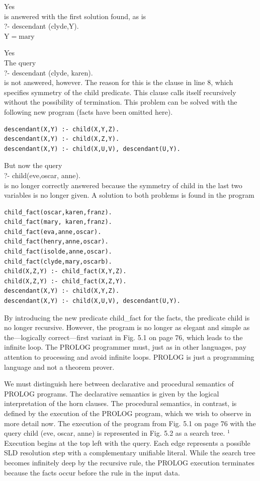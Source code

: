 \documentclass[10pt]{book}
\begin{document}
Yes\\
is answered with the first solution found, as is\\
?- descendant (clyde,Y).\\
$\mathrm{Y}=\mathrm{mar} \mathrm{y}$

Yes\\
The query\\
?- descendant (clyde, karen).\\
is not answered, however. The reason for this is the clause in line 8, which specifies symmetry of the child predicate. This clause calls itself recursively without the possibility of termination. This problem can be solved with the following new program (facts have been omitted here).
\begin{verbatim}
descendant(X,Y) :- child(X,Y,Z).
descendant(X,Y) :- child(X,Z,Y).
descendant(X,Y) :- child(X,U,V), descendant(U,Y).
\end{verbatim}

But now the query\\
?- child(eve,oscar, anne).\\
is no longer correctly answered because the symmetry of child in the last two variables is no longer given. A solution to both problems is found in the program
\begin{verbatim}
child_fact(oscar,karen,franz).
child_fact(mary, karen,franz).
child_fact(eva,anne,oscar).
child_fact(henry,anne,oscar).
child_fact(isolde,anne,oscar).
child_fact(clyde,mary,oscarb).
child(X,Z,Y) :- child_fact(X,Y,Z).
child(X,Z,Y) :- child_fact(X,Z,Y).
descendant(X,Y) :- child(X,Y,Z).
descendant(X,Y) :- child(X,U,V), descendant(U,Y).
\end{verbatim}

By introducing the new predicate child\_fact for the facts, the predicate child is no longer recursive. However, the program is no longer as elegant and simple as the—logically correct—first variant in Fig. 5.1 on page 76, which leads to the infinite loop. The PROLOG programmer must, just as in other languages, pay attention to processing and avoid infinite loops. PROLOG is just a programming language and not a theorem prover.

We must distinguish here between declarative and procedural semantics of PROLOG programs. The declarative semantics is given by the logical interpretation of the horn clauses. The procedural semantics, in contrast, is defined by the execution of the PROLOG program, which we wish to observe in more detail now. The execution of the program from Fig. 5.1 on page 76 with the query child (eve, oscar, anne) is represented in Fig. 5.2 as a search tree. ${ }^{1}$ Execution begins at the top left with the query. Each edge represents a possible SLD resolution step with a complementary unifiable literal. While the search tree becomes infinitely deep by the recursive rule, the PROLOG execution terminates because the facts occur before the rule in the input data.
\end{document}
